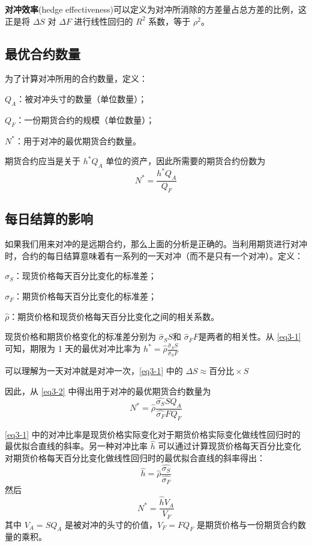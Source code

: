 \textbf{对冲效率}(hedge effectiveness)可以定义为对冲所消除的方差量占总方差的比例，这正是将 $\Delta S$ 对 $\Delta F$ 进行线性回归的 $R^2$ 系数，等于 $\rho^2$。

\subsection{最优合约数量}
为了计算对冲所用的合约数量，定义：

$Q_A$：被对冲头寸的数量（单位数量）；

$Q_F$：一份期货合约的规模（单位数量）；

$N^*$：用于对冲的最优期货合约数量。

期货合约应当是关于 $h^*Q_A$ 单位的资产，因此所需要的期货合约份数为
\begin{equation}\label{eq3-2}
    N^*=\frac{h^*Q_A}{Q_F}
\end{equation}
\subsection{每日结算的影响}
如果我们用来对冲的是远期合约，那么上面的分析是正确的。当利用期货进行对冲时，合约的每日结算意味着有一系列的一天对冲（而不是只有一个对冲）。定义：

$\hat{\sigma}_S$：现货价格每天百分比变化的标准差；

$\hat{\sigma}_F$：期货价格每天百分比变化的标准差；

$\hat{\rho}$：期货价格和现货价格每天百分比变化之间的相关系数。

现货价格和期货价格变化的标准差分别为 $\hat{\sigma}_SS$和 $\hat{\sigma}_FF$是两者的相关性。从 \autoref{eq3-1} 可知，期限为 1 天的最优对冲比率为
$h^*=\hat{\rho}\frac{\hat{\sigma}_SS}{\hat{\sigma}_SF}$
\begin{tcolorbox}
    可以理解为一天对冲就是对冲一次，\autoref{eq3-1} 中的 $\Delta S\approx \text{百分比}\times S$
\end{tcolorbox}

因此，从 \autoref{eq3-2} 中得出用于对冲的最优期货合约数量为
$$N^*=\hat{\rho}\frac{\hat{\sigma_S}SQ_A}{\hat{\sigma_F}FQ_F}$$

\autoref{eq3-1} 中的对冲比率是现货价格实际变化对于期货价格实际变化做线性回归时的最优拟合直线的斜率。另一种对冲比率 $\hat{h}$ 可以通过计算现货价格每天百分比变化对期货价格每天百分比变化做线性回归时的最优拟合直线的斜率得出：
$$\hat{h}=\hat{\rho}\frac{\hat{\sigma_S}}{\hat{\sigma_F}}$$
然后
\begin{equation}\label{eq3-3}
    N^*=\frac{\hat{h}V_A}{V_F}
\end{equation}
其中 $V_A=SQ_A$ 是被对冲的头寸的价值，$V_F=FQ_F$ 是期货价格与一份期货合约数量的乘积。

